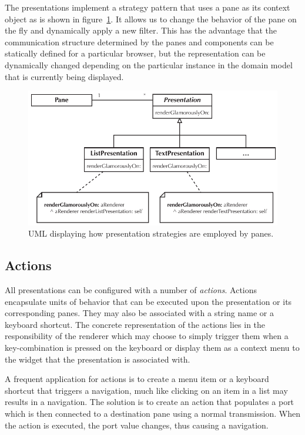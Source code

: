 \documentclass[a4paper,10pt,twoside]{book}
\begin{document}
The presentations implement a strategy pattern that uses a pane as its
context object as is shown in figure~\ref{fig:uml-strategy}. It allows
us to change the behavior of the pane on the fly and dynamically apply
a new filter. This has the advantage that the communication structure
determined by the panes and components can be statically defined for a
particular browser, but the representation can be dynamically changed
depending on the particular instance in the domain model that is
currently being displayed.

\begin{figure}[htbp]
\centerline{\includegraphics[width=\linewidth]{uml_strategy.pdf}}
\caption{UML displaying how presentation strategies are employed by panes.}
\label{fig:uml-strategy}
\end{figure}


\subsection{Actions}
\label{sec:impl/actions}

All presentations can be configured with a number of
\emph{actions}. Actions encapsulate units of behavior that can be
executed upon the presentation or its corresponding panes. They may
also be associated with a string name or a keyboard shortcut. The
concrete representation of the actions lies in the responsibility of
the renderer which may choose to simply trigger them when a
key-combination is pressed on the keyboard or display them as a
context menu to the widget that the presentation is associated with.

A frequent application for actions is to create a menu item or a
keyboard shortcut that triggers a navigation, much like clicking on an
item in a list may results in a navigation. The solution is to create
an action that populates a port which is then connected to a
destination pane using a normal transmission. When the action is
executed, the port value changes, thus causing a navigation.
\end{document}
